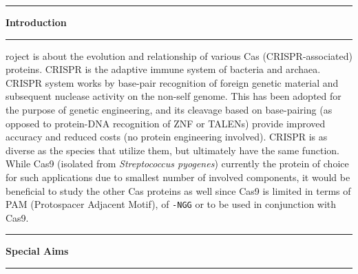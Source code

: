 \documentclass[11pt]{article}
\newcommand\question[2]{\vspace{.25in}\hrule\textbf{#1}\vspace{.5em}\hrule\vspace{.10in}}
\begin{document}
\raggedright
\newcommand\NAME{Christine Baek, Qi Chu, Yanyu Liang}  %

\question{Introduction}

Project is about the evolution and relationship of various Cas (CRISPR-associated) proteins. CRISPR is the adaptive immune system of bacteria and archaea. CRISPR system works by base-pair recognition of foreign genetic material and subsequent nuclease activity on the non-self genome. This has been adopted for the purpose of genetic engineering, and its cleavage based on base-pairing (as opposed to protein-DNA recognition of ZNF or TALENs) provide improved accuracy and reduced costs (no protein engineering involved). CRISPR is as diverse as the species that utilize them, but ultimately have the same function. While Cas9 (isolated from \textit{Streptococcus pyogenes}) currently the protein of choice for such applications due to smallest number of involved components, it would be beneficial to study the other Cas proteins as well since Cas9 is limited in terms of PAM (Protospacer Adjacent Motif), of \texttt{-NGG} or to be used in conjunction with Cas9. 

\question{Special Aims}


\question{Work Plan}
\end{document}
